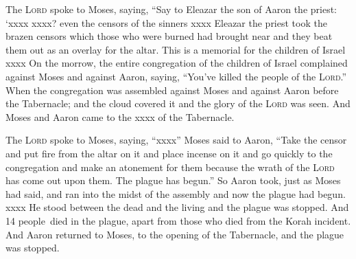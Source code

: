 
\begin{inparaenum}
   The \textsc{Lord} spoke to Moses, saying,%
   ``Say to Eleazar the son of Aaron the priest: `xxxx%
   xxxx? even the censors of the sinners xxxx%
   Eleazar the priest took the brazen censors which those who were burned had brought near and they beat them out as an overlay for the altar.%
   This is a memorial for the children of Israel xxxx%
   On the morrow, the entire congregation of the children of Israel complained against Moses and against Aaron, saying, ``You've killed the people of the \textsc{Lord}.''%
   When the congregation was assembled against Moses and against Aaron before the Tabernacle; and the cloud covered it and the glory of the \textsc{Lord} was seen.%
   And Moses and Aaron came to the xxxx of the Tabernacle.%
  
   The \textsc{Lord} spoke to Moses, saying,%
   ``xxxx''%
   Moses said to Aaron, ``Take the censor and put fire from the altar on it and place incense on it and go quickly to the congregation and make an atonement for them because the wrath of the \textsc{Lord} has come out upon them. The plague has begun.''%
   So Aaron took, just as Moses had said, and ran into the midst of the assembly and now the plague had begun. xxxx%
   He stood between the dead and the living and the plague was stopped.%
   And 14 people\understood\ died in the plague, apart from those who died from the Korah incident.%
   And Aaron returned to Moses, to the opening of the Tabernacle, and the plague was stopped.%
  

\end{inparaenum}
